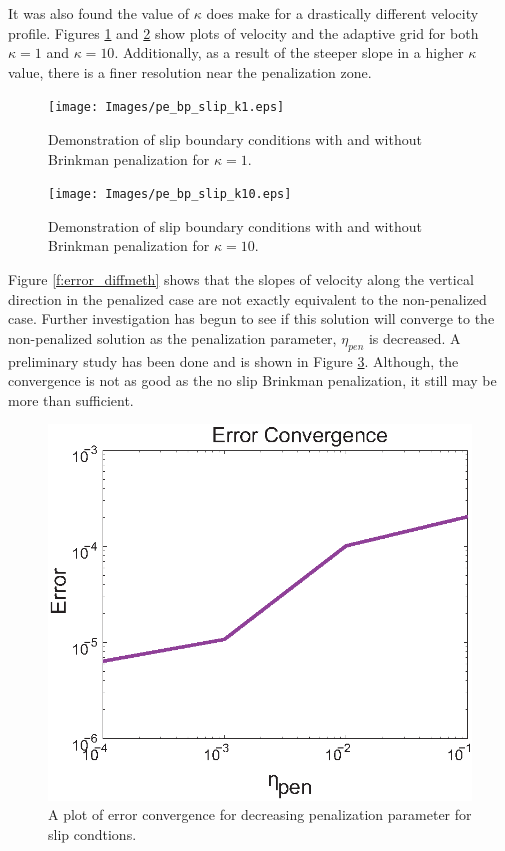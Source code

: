 It was also found the value of $\kappa$ does make for a drastically different velocity profile.  Figures \ref{f:slip} and \ref{f:slipk10} show plots of velocity and the adaptive grid for both $\kappa=1$ and $\kappa=10$.  Additionally, as a result of the steeper slope in a higher $\kappa$ value, there is a finer resolution near the penalization zone.  

\begin{center}
\begin{figure}[htp]
\centering
  \texttt{[image: Images/pe\_bp\_slip\_k1.eps]}
  \caption[Slip conditions, $\kappa=1$, with and without penalization]{Demonstration of slip boundary conditions with and without Brinkman penalization for $\kappa=1$.}\label{f:slip}
\end{figure}
\end{center}

\begin{center}
\begin{figure}[htp]
\centering
  \texttt{[image: Images/pe\_bp\_slip\_k10.eps]}
  \caption[Slip conditions, $\kappa=10$, with and without penalization]{Demonstration of slip boundary conditions with and without Brinkman penalization for $\kappa=10$.}\label{f:slipk10}
\end{figure}
\end{center}

Figure \ref{f:error_diffmeth} shows that the slopes of velocity along the vertical direction in the penalized case are not exactly equivalent to the non-penalized case.  Further investigation has begun to see if this solution will converge to the non-penalized solution as the penalization parameter, $\eta_{pen}$ is decreased.  A preliminary study has been done and is shown in Figure \ref{f:errorconverge_slip}.  Although, the convergence is not as good as the no slip Brinkman penalization, it still may be more than sufficient.  

\begin{center}
\begin{figure}[htp]
\centering
  \includegraphics[width=3 in]{Images/errorconverge_slip.eps}
  \caption[Error convergence for slip conditions]{A plot of error convergence for decreasing penalization parameter for slip condtions.}\label{f:errorconverge_slip}
\end{figure}
\end{center}
